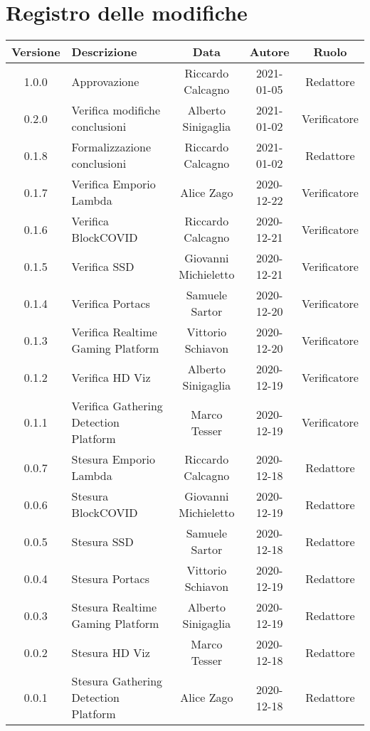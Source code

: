 \section*{Registro delle modifiche}

\begin{center}
	\begin{longtable}{|c|p{5cm}|c|c|c|}
	\hline
	\rowcolor{lighter-grayer}
	\textbf{Versione} & \textbf{Descrizione} & \textbf{Data} & \textbf{Autore} & \textbf{Ruolo} \\
	\hline
	\endfirsthead
	
	1.0.0 & Approvazione & Riccardo Calcagno & 2021-01-05 & Redattore\\
	\hline
	0.2.0 & Verifica modifiche conclusioni & Alberto Sinigaglia & 2021-01-02 & Verificatore\\
	\hline
	0.1.8 & Formalizzazione conclusioni & Riccardo Calcagno & 2021-01-02 & Redattore\\
	\hline
	
	0.1.7 & Verifica Emporio Lambda & Alice Zago & 2020-12-22 & Verificatore\\
	\hline
	0.1.6 & Verifica BlockCOVID & Riccardo Calcagno & 2020-12-21 & Verificatore \\
	\hline
	0.1.5 & Verifica SSD & Giovanni Michieletto & 2020-12-21 & Verificatore \\
	\hline
	0.1.4 & Verifica Portacs & Samuele Sartor & 2020-12-20 & Verificatore \\
	\hline
	0.1.3 & Verifica Realtime Gaming Platform  & Vittorio Schiavon & 2020-12-20 & Verificatore \\
	\hline
	0.1.2 & Verifica HD Viz & Alberto Sinigaglia & 2020-12-19 & Verificatore \\
	\hline
	0.1.1 & Verifica Gathering Detection Platform & Marco Tesser  & 2020-12-19 & Verificatore\\
	\hline
	
	0.0.7 & Stesura Emporio Lambda & Riccardo Calcagno & 2020-12-18 & Redattore\\
	\hline
	0.0.6 & Stesura BlockCOVID & Giovanni Michieletto & 2020-12-19 & Redattore \\
	\hline
	0.0.5 & Stesura SSD & Samuele Sartor & 2020-12-18 & Redattore \\
	\hline
	0.0.4 & Stesura Portacs & Vittorio Schiavon & 2020-12-19 & Redattore \\
	\hline
	0.0.3 & Stesura Realtime Gaming Platform  & Alberto Sinigaglia & 2020-12-19 & Redattore \\
	\hline
	0.0.2 & Stesura HD Viz & Marco Tesser & 2020-12-18 & Redattore \\
	\hline
	0.0.1 & Stesura Gathering Detection Platform & Alice Zago & 2020-12-18 & Redattore\\
	\hline
	\end{longtable}
\end{center}